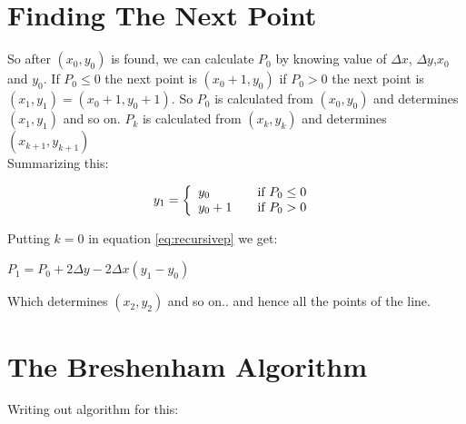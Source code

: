 \documentclass[a4paper,12pt,oneside]{book}
\begin{document}
 
\section{Finding The Next Point}
So after $(x_0,y_0)$ is found, we can calculate $P_0$ by knowing value of $\Delta x$, $\Delta y$,$x_0$ and $y_0$. If $P_0\leq 0$ the next point is $(x_0+1,y_0)$ if $P_0>0$ the next point is $(x_1,y_1)=(x_0+1,y_0+1)$. So $P_0$ is calculated from $(x_0,y_0)$ and determines $(x_1,y_1)$ and so on. $P_k$ is calculated from $(x_k,y_k)$ and determines $(x_{k+1},y_{k+1})$ \\ 
Summarizing this:
\begin{center}
\begin{equation} 
	y_1 = \left\{ 
				\begin{array}{l l}
					y_0 & \quad \text{if $P_0\leq 0$ }\\
					y_0+1 & \quad \text{if $P_0>0$ }
				\end{array} 
		\right.
\end{equation}
\end{center} 
Putting $k=0$ in equation \ref{eq:recursivep} we get:
\begin{center}
	$P_1=P_0+2\Delta y-2\Delta x (y_1-y_0)$
\end{center}

Which determines $(x_2,y_2)$ and so on.. and hence all the points of the line.

\section{The Breshenham Algorithm}
Writing out algorithm for this:
\end{document}
